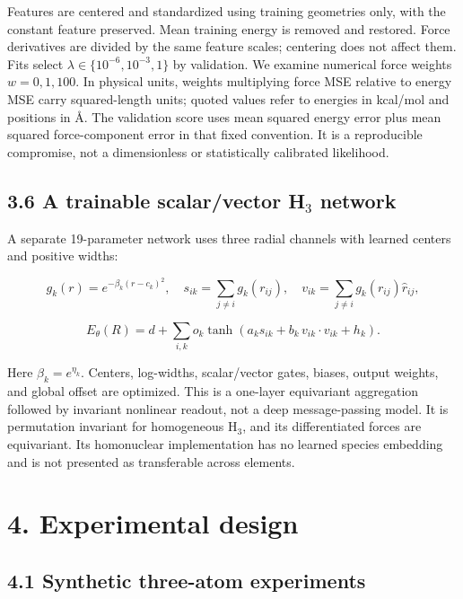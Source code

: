 \documentclass[
  11pt,
  a4paper,
]{article}
\begin{document}
Features are centered and standardized using training geometries only,
with the constant feature preserved. Mean training energy is removed and
restored. Force derivatives are divided by the same feature scales;
centering does not affect them. Fits select
\(\lambda\in\{10^{-6},10^{-3},1\}\) by validation. We examine numerical
force weights \(w=0,1,100\). In physical units, weights multiplying
force MSE relative to energy MSE carry squared-length units; quoted
values refer to energies in kcal/mol and positions in Å. The validation
score uses mean squared energy error plus mean squared force-component
error in that fixed convention. It is a reproducible compromise, not a
dimensionless or statistically calibrated likelihood.

\hypertarget{a-trainable-scalarvector-h_3-network}{%
\subsection{\texorpdfstring{3.6 A trainable scalar/vector H\(_3\)
network}{3.6 A trainable scalar/vector H\_3 network}}\label{a-trainable-scalarvector-h_3-network}}

A separate 19-parameter network uses three radial channels with learned
centers and positive widths:

\[g_k(r)=e^{-\beta_k(r-c_k)^2},\quad s_{ik}=\sum_{j\ne i}g_k(r_{ij}),\quad v_{ik}=\sum_{j\ne i}g_k(r_{ij})\hat r_{ij},\]

\[E_\theta(R)=d+\sum_{i,k}o_k\tanh\left(a_ks_{ik}+b_k\,v_{ik}\cdot v_{ik}+h_k\right).\]

Here \(\beta_k=e^{\eta_k}\). Centers, log-widths, scalar/vector gates,
biases, output weights, and global offset are optimized. This is a
one-layer equivariant aggregation followed by invariant nonlinear
readout, not a deep message-passing model. It is permutation invariant
for homogeneous H\(_3\), and its differentiated forces are equivariant.
Its homonuclear implementation has no learned species embedding and is
not presented as transferable across elements.

\hypertarget{experimental-design}{%
\section{4. Experimental design}\label{experimental-design}}

\hypertarget{synthetic-three-atom-experiments}{%
\subsection{4.1 Synthetic three-atom
experiments}\label{synthetic-three-atom-experiments}}
\end{document}

